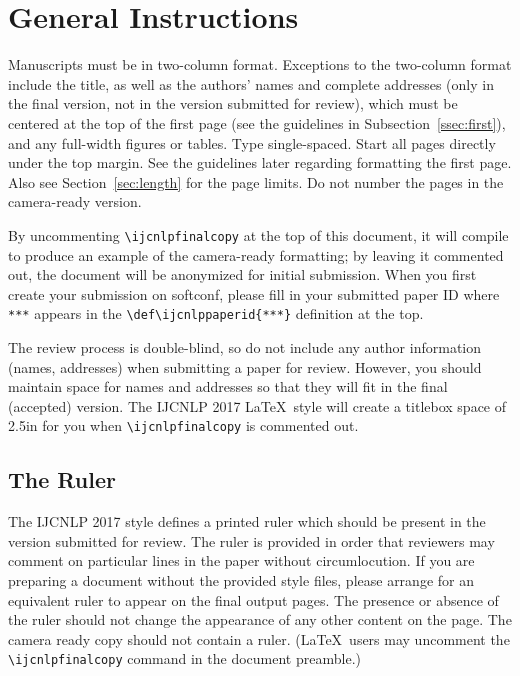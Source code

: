 \documentclass[11pt,letterpaper]{article}
\def\ijcnlppaperid{***}
\begin{document}
\section{General Instructions}

Manuscripts must be in two-column format.  Exceptions to the two-column
format include the title, as well as the authors' names and complete
addresses (only in the final version, not in the version submitted for
review), which must be centered at the top of the first page (see the
guidelines in Subsection~\ref{ssec:first}), and any full-width figures or
tables.  Type single-spaced. Start all pages directly under the top margin.  
See the guidelines later regarding formatting the first page.  Also see 
Section~\ref{sec:length} for the page limits.
Do not number the pages in the camera-ready version. 

By uncommenting {\small\verb|\ijcnlpfinalcopy|} at the top of this document,
it will compile to produce an example of the camera-ready formatting; by
leaving it commented out, the document will be anonymized for initial
submission.  When you first create your submission on softconf, please fill
in your submitted paper ID where {\small\verb|***|} appears in the
{\small\verb|\def\ijcnlppaperid{***}|} definition at the top.

The review process is double-blind, so do not include any author information
(names, addresses) when submitting a paper for review. However, you should
maintain space for names and addresses so that they will fit in the final
(accepted) version.  The IJCNLP 2017 \LaTeX\ style will create a titlebox
space of 2.5in for you when {\small\verb|\ijcnlpfinalcopy|} is commented out.

\subsection{The Ruler}
The IJCNLP 2017 style defines a printed ruler which should be present in the
version submitted for review.  The ruler is provided in order that
reviewers may comment on particular lines in the paper without
circumlocution.  If you are preparing a document without the provided
style files, please arrange for an equivalent ruler to
appear on the final output pages.  The presence or absence of the ruler
should not change the appearance of any other content on the page.  The
camera ready copy should not contain a ruler. (\LaTeX\ users may uncomment
the {\small\verb|\ijcnlpfinalcopy|} command in the document preamble.)  
\end{document}
